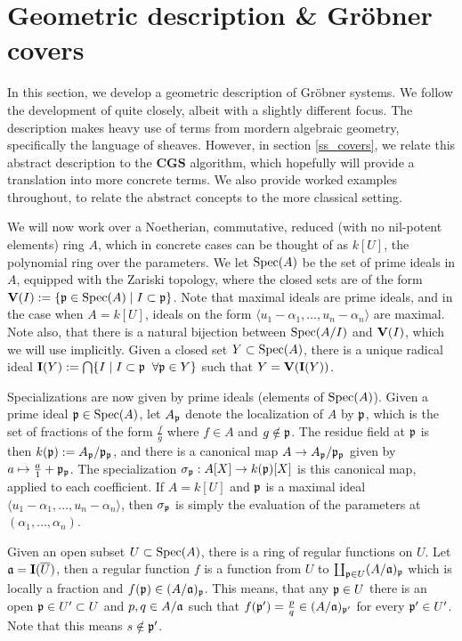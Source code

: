 
\section{Geometric description \& Gröbner covers}
In this section, we develop a geometric description of Gröbner systems. We follow the development of \cite{grb_covers} quite closely, albeit with a slightly different focus. The description makes heavy use of terms from mordern algebraic geometry, specifically the language of sheaves. However, in section \ref{ss_covers}, we relate this abstract description to the $\mathbf{CGS}$ algorithm, which hopefully will provide a translation into more concrete terms. We also provide worked examples throughout, to relate the abstract concepts to the more classical setting.

We will now work over a Noetherian, commutative, reduced (with no nil-potent elements) ring $A$, which in concrete cases can be thought of as $k[U]$, the polynomial ring over the parameters. We let $\operatorname{Spec}(A)$ be the set of prime ideals in $A$, equipped with the Zariski topology, where the closed sets are of the form $\operatorname{\mathbf V}(I) := \{\mathfrak p \in \operatorname{Spec}(A) \mid I \subset \mathfrak p\}$. Note that maximal ideals are prime ideals, and in the case when $A = k[U]$, ideals on the form $\langle u_{1} - \alpha_{1}, \dots, u_{n} - \alpha_{n} \rangle$ are maximal. Note also, that there is a natural bijection between $\operatorname{Spec}(A/I)$ and $\operatorname{\mathbf V}(I)$, which we will use implicitly. Given a closed set $Y \subset \operatorname{Spec}(A)$, there is a unique radical ideal $\operatorname{\mathbf I}(Y) := \bigcap\{I \mid I \subset \mathfrak p \;\; \forall \mathfrak p \in Y\}$ such that $Y = \operatorname{\mathbf V}(\operatorname{\mathbf I}(Y))$.

Specializations are now given by prime ideals (elements of $\operatorname{Spec}(A)$). Given a prime ideal $\mathfrak p \in \operatorname{Spec}(A)$, let $A_{\mathfrak p}$ denote the localization of $A$ by $\mathfrak p$, which is the set of fractions of the form $\frac{f}{g}$ where $f \in A$ and $g \notin \mathfrak p$. The residue field at $\mathfrak p$ is then $k(\mathfrak p) := A_{\mathfrak p}/\mathfrak p_{\mathfrak p}$, and there is a canonical map $A \to A_{\mathfrak p}/\mathfrak p_{\mathfrak p}$ given by $a \mapsto \frac a 1 + \mathfrak p_{\mathfrak p}$. The specialization $\sigma_{\mathfrak p} : A[X] \to k(\mathfrak p)[X]$ is this canonical map, applied to each coefficient. If $A = k[U]$ and $\mathfrak p$ is a maximal ideal $\langle u_{1} - \alpha_{1}, \dots, u_{n} - \alpha_{n} \rangle$, then $\sigma_{\mathfrak p}$ is simply the evaluation of the parameters at $(\alpha_{1}, \dots, \alpha_{n})$.

Given an open subset $U \subset \operatorname{Spec}(A)$, there is a ring of regular functions on $U$. Let $\mathfrak{a} = \operatorname{\mathbf I}(\overline U)$, then a regular function $f$ is a function from $U$ to $\coprod_{\mathfrak p \in U} (A/\mathfrak{a})_{\mathfrak p}$ which is locally a fraction and $f(\mathfrak p) \in (A/\mathfrak{a})_{\mathfrak p}$. This means, that any $\mathfrak p \in U$ there is an open $\mathfrak p \in U' \subset U$ and $p, q \in A/\mathfrak{a}$ such that $f(\mathfrak p') = \frac p q \in (A/\mathfrak{a})_{\mathfrak p'}$ for every $\mathfrak p' \in U'$. Note that this means $s \notin \mathfrak p'$.

